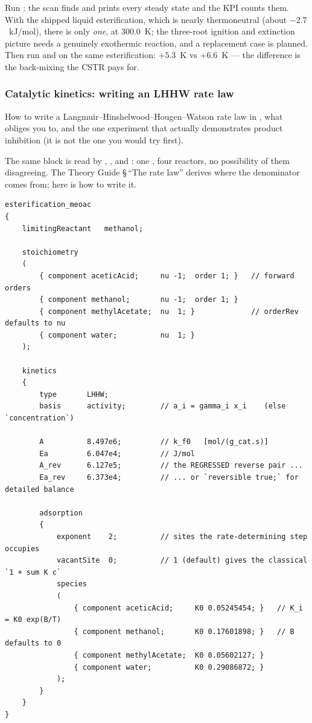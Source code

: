 \documentclass[11pt,a4paper]{article}
\begin{document}
\begin{tryit}
Run : the scan
finds and prints every steady state and the  KPI
counts them.  With the shipped liquid esterification, which is nearly
thermoneutral (about $-2.7$~kJ/mol), there is only \emph{one}, at
300.0~K; the three-root ignition and extinction picture needs a
genuinely exothermic reaction, and a replacement case is planned.  Then
run  and  on the same
esterification: $+5.3$~K vs $+6.6$~K --- the difference is the
back-mixing the CSTR pays for.
\end{tryit}

\subsubsection{Catalytic kinetics: writing an LHHW rate law}\label{sec:lhhw}

\begin{whatyoulllearn}
How to write a Langmuir--Hinshelwood--Hougen--Watson rate law in
, what  obliges you to,
and the one experiment that actually demonstrates product inhibition
(it is not the one you would try first).
\end{whatyoulllearn}

The same block is read by , , 
and : one , four reactors, no
possibility of them disagreeing.  The Theory Guide \S\,``The rate law''
derives where the denominator comes from; here is how to write it.

\begin{lstlisting}
esterification_meoac
{
    limitingReactant   methanol;

    stoichiometry
    (
        { component aceticAcid;     nu -1;  order 1; }   // forward orders
        { component methanol;       nu -1;  order 1; }
        { component methylAcetate;  nu  1; }             // orderRev defaults to nu
        { component water;          nu  1; }
    );

    kinetics
    {
        type       LHHW;
        basis      activity;        // a_i = gamma_i x_i    (else `concentration`)

        A          8.497e6;         // k_f0   [mol/(g_cat.s)]
        Ea         6.047e4;         // J/mol
        A_rev      6.127e5;         // the REGRESSED reverse pair ...
        Ea_rev     6.373e4;         // ... or `reversible true;` for detailed balance

        adsorption
        {
            exponent    2;          // sites the rate-determining step occupies
            vacantSite  0;          // 1 (default) gives the classical `1 + sum K c`
            species
            (
                { component aceticAcid;     K0 0.05245454; }   // K_i = K0 exp(B/T)
                { component methanol;       K0 0.17601898; }   // B defaults to 0
                { component methylAcetate;  K0 0.05602127; }
                { component water;          K0 0.29086872; }
            );
        }
    }
}
\end{lstlisting}
\end{document}
